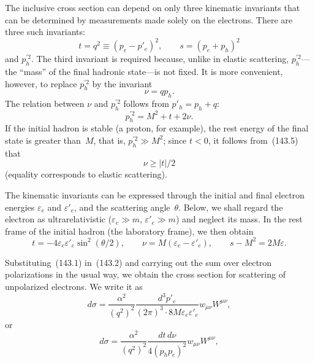 The inclusive cross section can depend on only three kinematic invariants that can be determined by measurements made solely on the electrons. There are three such invariants:
\begin{equation}
t=q^2\equiv(p_e-p'_e)^2,\qquad s=(p_e+p_h)^2
\tag{143.3}
\end{equation}
and $p_h^{\prime 2}$. The third invariant is required because, unlike in elastic scattering, $p_h^{\prime 2}$---the ``mass'' of the final hadronic state---is not fixed. It is more convenient, however, to replace $p_h^{\prime 2}$ by the invariant
\begin{equation}
\nu=qp_h.
\tag{143.4}
\end{equation}
The relation between $\nu$ and $p_h^{\prime 2}$ follows from $p'_h=p_h+q$:
\begin{equation}
p_h^{\prime 2}=M^2+t+2\nu.
\tag{143.5}
\end{equation}
If the initial hadron is stable (a proton, for example), the rest energy of the final state is greater than~$M$, that is, $p_h^{\prime 2}\gg M^2$; since $t<0$, it follows from~(143.5) that
\begin{equation}
\nu\geq|t|/2
\tag{143.6}
\end{equation}
(equality corresponds to elastic scattering).

The kinematic invariants can be expressed through the initial and final electron energies $\varepsilon_e$ and $\varepsilon'_e$, and the scattering angle~$\theta$. Below, we shall regard the electron as ultrarelativistic ($\varepsilon_e\gg m$, $\varepsilon'_e\gg m$) and neglect its mass. In the rest frame of the initial hadron (the laboratory frame), we then obtain
\begin{equation}
t=-4\varepsilon_e\varepsilon'_e\sin^2(\theta/2),\qquad
\nu=M(\varepsilon_e-\varepsilon'_e),\qquad
s-M^2=2M\varepsilon.
\tag{143.7}
\end{equation}

Substituting~(143.1) in~(143.2) and carrying out the sum over electron polarizations in the usual way, we obtain the cross section for scattering of unpolarized electrons. We write it as
\begin{equation}
d\sigma=\frac{\alpha^2}{(q^2)^2}
\frac{d^3p'_e}{(2\pi)^3\cdot8M\varepsilon_e\varepsilon'_e}
w_{\mu\nu}W^{\mu\nu},
\tag{143.8}
\end{equation}
or
\begin{equation}
d\sigma=\frac{\alpha^2}{(q^2)^2}
\frac{dt\,d\nu}{4(p_hp_e)^2}w_{\mu\nu}W^{\mu\nu},
\tag{143.9}
\end{equation}

